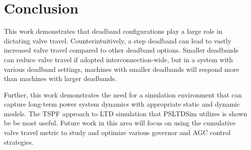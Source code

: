 \section{Conclusion}
This work demonstrates that deadband configurations play a large role in dictating valve travel.
Counterintuitively, a step deadband can lead to vastly increased valve travel compared to other deadband options.
Smaller deadbands can reduce valve travel if adopted interconnection-wide, but
in a system with various deadband settings, machines with smaller deadbands will respond more than machines with larger deadbands.

Further, this work demonstrates the need for a simulation environment that can capture long-term power system dynamics with appropriate static and dynamic models. 
The TSPF approach to LTD simulation that PSLTDSim utilizes is shown be be most useful.
Future work in this area will focus on using the cumulative valve travel metric to study and optimize various governor and AGC control strategies.

